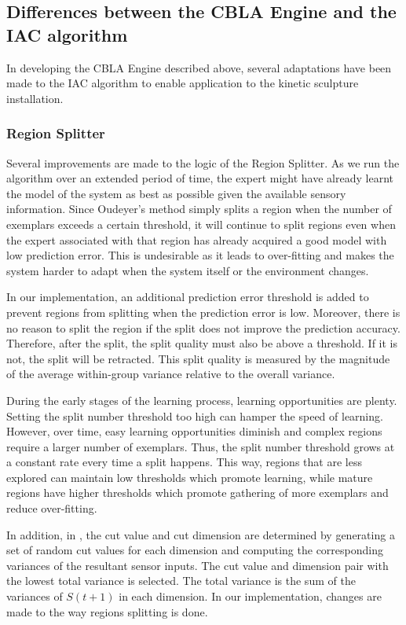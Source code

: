 \subsection{Differences between the CBLA Engine and the IAC algorithm}

In developing the CBLA Engine described above, several adaptations have been made to the IAC algorithm to enable application to the kinetic sculpture installation. 

\subsubsection{Region Splitter}

Several improvements are made to the logic of the Region Splitter. As we run the algorithm over an extended period of time, the expert might have already learnt the model of the system as best as possible given the available sensory information. Since Oudeyer's method simply splits a region when the number of exemplars exceeds a certain threshold, it will continue to split regions even when the expert associated with that region has already acquired a good model with low prediction error. This is undesirable as it leads to over-fitting and makes the system harder to adapt when the system itself or the environment changes. 

In our implementation, an additional prediction error threshold is added to prevent regions from splitting when the prediction error is low. Moreover, there is no reason to split the region if the split does not improve the prediction accuracy. Therefore, after the split, the split quality must also be above a threshold. If it is not, the split will be retracted. This split quality is measured by the magnitude of the average within-group variance relative to the overall variance.

During the early stages of the learning process, learning opportunities are plenty. Setting the split number threshold too high can hamper the speed of learning. However, over time, easy learning opportunities diminish and complex regions require a larger number of exemplars. Thus, the split number threshold grows at a constant rate every time a split happens. This way, regions that are less explored can maintain low thresholds which promote learning, while mature regions have higher thresholds which promote gathering of more exemplars and reduce over-fitting.

In addition, in \cite{Oudeyer2007}, the cut value and cut dimension are determined by generating a set of random cut values for each dimension and computing the corresponding variances of the resultant sensor inputs. The cut value and dimension pair with the lowest total variance is selected. The total variance is the sum of the variances of $S(t+1)$ in each dimension. In our implementation, changes are made to the way regions splitting is done.

